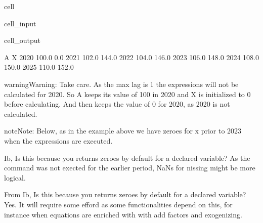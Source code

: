 \documentclass[letterpaper,10pt,english]{jupyterBook}
\begin{document}
\begin{sphinxuseclass}{cell}\begin{sphinxVerbatimInput}

\begin{sphinxuseclass}{cell_input}
\begin{sphinxVerbatim}[commandchars=\\\{\}]
  


\end{sphinxVerbatim}

\end{sphinxuseclass}\end{sphinxVerbatimInput}
\begin{sphinxVerbatimOutput}

\begin{sphinxuseclass}{cell_output}
\begin{sphinxVerbatim}[commandchars=\\\{\}]
          A      X
2020  100.0    0.0
2021  102.0  144.0
2022  104.0  146.0
2023  106.0  148.0
2024  108.0  150.0
2025  110.0  152.0
\end{sphinxVerbatim}

\end{sphinxuseclass}\end{sphinxVerbatimOutput}

\end{sphinxuseclass}
\begin{sphinxadmonition}{warning}{Warning:}
\sphinxAtStartPar
Take care. As the max lag is 1 the expressions will not be calculated for 2020. So A keeps its
value of 100 in 2020 and X is initialized to 0 before calculating. And then keeps the value of 0
for 2020, as 2020 is not calculated.
\end{sphinxadmonition}

\begin{sphinxadmonition}{note}{Note:}
\sphinxAtStartPar
Below, as in the example above we have zeroes for x prior to 2023 when the expressions are executed.

\sphinxAtStartPar
 Ib, Is this  because you returns zeroes by default for a declared variable? As the command was not exected for the earlier period, NaNs for nissing might be more logical.

\sphinxAtStartPar
 From Ib, Is this  because you returns zeroes by default for a declared variable? Yes. It will require some efford as some functionalities depend on this, for instance when equations are enriched with with add factors and exogenizing.
\end{sphinxadmonition}
\end{document}
